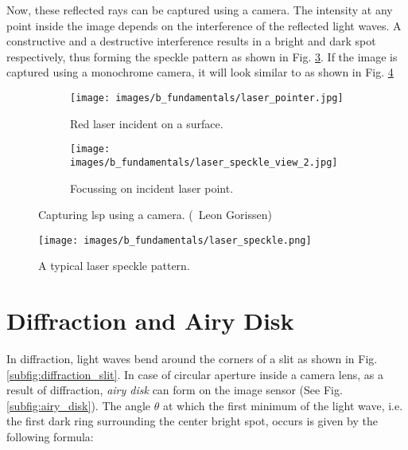     \noindent Now, these reflected rays can be captured using a camera. The intensity at any point inside the image depends on the interference of the reflected light waves. A constructive and a destructive interference results in a bright and dark spot respectively, thus forming the speckle pattern as shown in Fig. \ref{fig:img_leon}. If the image is captured using a monochrome camera, it will look similar to as shown in Fig. \ref{fig:laser_speckle.jpg}

    \begin{figure}[h]
        \begin{subfigure}{0.5\textwidth}
            \centering
            \texttt{[image: images/b\_fundamentals/laser\_pointer.jpg]}
            \caption{Red laser incident on a surface.}
            \label{subfig:laser_pointer.jpg}
        \end{subfigure}
        \begin{subfigure}{0.5\textwidth}
            \centering
            \texttt{[image: images/b\_fundamentals/laser\_speckle\_view\_2.jpg]}
            \caption{Focussing on incident laser point.}
            \label{subfig:laser_speckle_view_2.jpg}
        \end{subfigure}
        \caption{Capturing \gls{lsp} using a camera. (\textcopyright \ Leon Gorissen) \cite{img_gorissen}}
        \label{fig:img_leon}
    \end{figure}
    
    \begin{figure}[h]
        \centering
        \texttt{[image: images/b\_fundamentals/laser\_speckle.png]}
        \caption{A typical laser speckle pattern.}
        \label{fig:laser_speckle.jpg}
    \end{figure}

    \section*{Diffraction and Airy Disk}\label{section:diffraction}

    In diffraction, light waves bend around the corners of a slit as shown in Fig. \ref{subfig:diffraction_slit}. In case of circular aperture inside a camera lens, as a result of diffraction, \emph{airy disk} can form on the image sensor (See Fig. \ref{subfig:airy_disk}). The angle $\theta$ at which the first minimum of the light wave, i.e. the first dark ring surrounding the center bright spot, occurs is given by the following formula:

